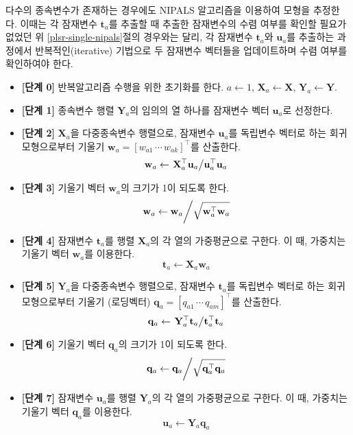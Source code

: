\documentclass[]{book}
\providecommand{\tightlist}{%
  \setlength{\itemsep}{0pt}\setlength{\parskip}{0pt}}
\begin{document}
다수의 종속변수가 존재하는 경우에도 NIPALS 알고리즘을 이용하여 모형을 추정한다. 이때는 각 잠재변수 \(\mathbf{t}_a\)를 추출할 때 추출한 잠재변수의 수렴 여부를 확인할 필요가 없었던 위 \ref{plsr-single-nipals}절의 경우와는 달리, 각 잠재변수 \(\mathbf{t}_a\)와 \(\mathbf{u}_a\)를 추출하는 과정에서 반복적인(iterative) 기법으로 두 잠재변수 벡터들을 업데이트하며 수렴 여부를 확인하여야 한다.

\begin{itemize}
\tightlist
\item
  \textbf{{[}단계 0{]}} 반복알고리즘 수행을 위한 초기화를 한다. \(a \leftarrow 1\), \(\mathbf{X}_a \leftarrow \mathbf{X}\), \(\mathbf{Y}_a \leftarrow \mathbf{Y}\).
\item
  \textbf{{[}단계 1{]}} 종속변수 행렬 \(\mathbf{Y}_a\)의 임의의 열 하나를 잠재변수 벡터 \(\mathbf{u}_a\)로 선정한다.
\item
  \textbf{{[}단계 2{]}} \(\mathbf{X}_a\)을 다중종속변수 행렬으로, 잠재변수 \(\mathbf{u}_a\)를 독립변수 벡터로 하는 회귀모형으로부터 기울기 \(\mathbf{w}_a = [w_{a1} \, \cdots \, w_{ak}]^\top\)를 산출한다.
  \[\mathbf{w}_a \leftarrow \left. \mathbf{X}_a^\top \mathbf{u}_a \middle/ \mathbf{u}_a^\top \mathbf{u}_a \right.  \]
\item
  \textbf{{[}단계 3{]}} 기울기 벡터 \(\mathbf{w}_a\)의 크기가 1이 되도록 한다.
  \[\left. \mathbf{w}_a \leftarrow \mathbf{w}_a \middle/ \sqrt{\mathbf{w}_a^\top \mathbf{w}_a} \right.\]
\item
  \textbf{{[}단계 4{]}} 잠재변수 \(\mathbf{t}_a\)를 행렬 \(\mathbf{X}_a\)의 각 열의 가중평균으로 구한다. 이 때, 가중치는 기울기 벡터 \(\mathbf{w}_a\)를 이용한다.
  \[\mathbf{t}_a \leftarrow \mathbf{X}_a \mathbf{w}_a\]
\item
  \textbf{{[}단계 5{]}} \(\mathbf{Y}_a\)을 다중종속변수 행렬으로, 잠재변수 \(\mathbf{t}_a\)를 독립변수 벡터로 하는 회귀모형으로부터 기울기 (로딩벡터) \(\mathbf{q}_a = [q_{a1} \, \cdots \, q_{am}]^\top\)를 산출한다.
  \[\mathbf{q}_a \leftarrow \left. \mathbf{Y}_a^\top \mathbf{t}_a \middle/ \mathbf{t}_a^\top \mathbf{t}_a \right.  \]
\item
  \textbf{{[}단계 6{]}} 기울기 벡터 \(\mathbf{q}_a\)의 크기가 1이 되도록 한다.
  \[\left. \mathbf{q}_a \leftarrow \mathbf{q}_a \middle/ \sqrt{\mathbf{q}_a^\top \mathbf{q}_a} \right.\]
\item
  \textbf{{[}단계 7{]}} 잠재변수 \(\mathbf{u}_a\)를 행렬 \(\mathbf{Y}_a\)의 각 열의 가중평균으로 구한다. 이 때, 가중치는 기울기 벡터 \(\mathbf{q}_a\)를 이용한다.
  \[\mathbf{u}_a \leftarrow \mathbf{Y}_a \mathbf{q}_a\]

\end{itemize}
\end{document}

